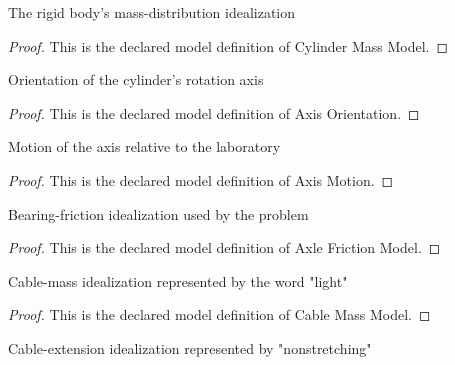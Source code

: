 \begin{definition}
  \label{def:physics:phyx-mini-0821:phyxminiproblems-problemphyxmini0821-cylindermassmodel}
  The rigid body's mass-distribution idealization
\end{definition}
\begin{proof}
  This is the declared model definition of Cylinder Mass Model.
\end{proof}
\begin{definition}
  \label{def:physics:phyx-mini-0821:phyxminiproblems-problemphyxmini0821-axisorientation}
  Orientation of the cylinder's rotation axis
\end{definition}
\begin{proof}
  This is the declared model definition of Axis Orientation.
\end{proof}
\begin{definition}
  \label{def:physics:phyx-mini-0821:phyxminiproblems-problemphyxmini0821-axismotion}
  Motion of the axis relative to the laboratory
\end{definition}
\begin{proof}
  This is the declared model definition of Axis Motion.
\end{proof}
\begin{definition}
  \label{def:physics:phyx-mini-0821:phyxminiproblems-problemphyxmini0821-axlefrictionmodel}
  Bearing-friction idealization used by the problem
\end{definition}
\begin{proof}
  This is the declared model definition of Axle Friction Model.
\end{proof}
\begin{definition}
  \label{def:physics:phyx-mini-0821:phyxminiproblems-problemphyxmini0821-cablemassmodel}
  Cable-mass idealization represented by the word "light"
\end{definition}
\begin{proof}
  This is the declared model definition of Cable Mass Model.
\end{proof}
\begin{definition}
  \label{def:physics:phyx-mini-0821:phyxminiproblems-problemphyxmini0821-cablestretchmodel}
  Cable-extension idealization represented by "nonstretching"
\end{definition}
